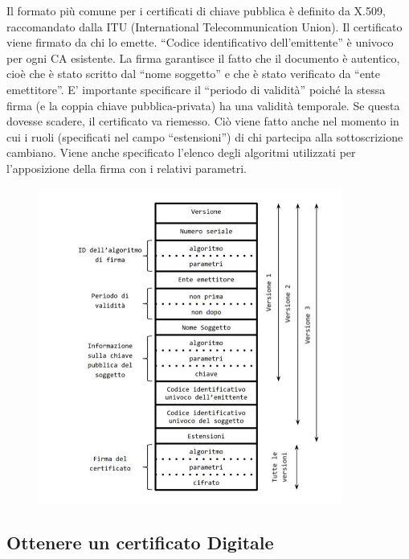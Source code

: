 Il formato più comune per i certificati di chiave pubblica è definito da X.509, raccomandato dalla
ITU (International Telecommunication Union).
Il certificato viene firmato da chi lo emette. “Codice identificativo
dell'emittente” è univoco per ogni
CA esistente. La firma garantisce il fatto che il documento è autentico,
cioè che è stato scritto dal
“nome soggetto” e che è stato verificato da “ente emettitore”.
E' importante specificare il “periodo di validità” poiché la stessa firma
(e la coppia chiave
pubblica-privata) ha una validità temporale. Se questa dovesse scadere,
il certificato va riemesso.
Ciò viene fatto anche nel momento in cui i ruoli (specificati nel campo
“estensioni”) di chi partecipa
alla sottoscrizione cambiano.
Viene anche specificato l'elenco degli algoritmi utilizzati per
l'apposizione della firma con i relativi
parametri.

\begin{figure}[H]
    \centering
    \includegraphics[width=10cm, keepaspectratio]{capitoli/crittografia/imgs/x509.png}
\end{figure}

\subsection{Ottenere un certificato Digitale}

